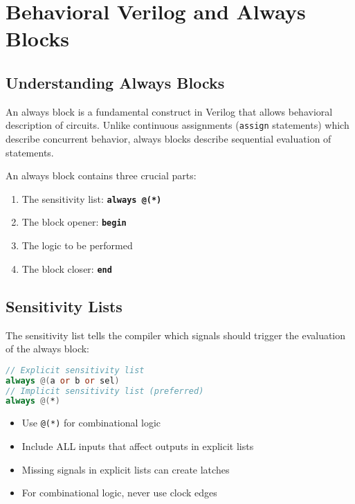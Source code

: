 \documentclass[12pt]{labmanual}
\begin{document}
\section{Behavioral Verilog and Always Blocks}

\subsection{Understanding Always Blocks}

An always block is a fundamental construct in Verilog that allows behavioral description of circuits. Unlike continuous assignments (\texttt{assign} statements) which describe concurrent behavior, always blocks describe sequential evaluation of statements.

\begin{important}[frametitle={Always Block Structure}]
An always block contains three crucial parts:
\begin{enumerate}
    \item The sensitivity list: \textbf{\texttt{always @(*)}}
    \item The block opener: \textbf{\texttt{begin}}
    \item The logic to be performed 
    \item The block closer: \textbf{\texttt{end}}
\end{enumerate}
\end{important}

\subsection{Sensitivity Lists}

The sensitivity list tells the compiler which signals should trigger the evaluation of the always block:

\begin{lstlisting}[language=verilog]
// Explicit sensitivity list
always @(a or b or sel) 
// Implicit sensitivity list (preferred)
always @(*)
\end{lstlisting}

\begin{extra}[frametitle={Sensitivity List Best Practices}]
\begin{itemize}
    \item Use \texttt{@(*)} for combinational logic
    \item Include ALL inputs that affect outputs in explicit lists
    \item Missing signals in explicit lists can create latches
    \item For combinational logic, never use clock edges
\end{itemize}
\end{extra}
\end{document}
